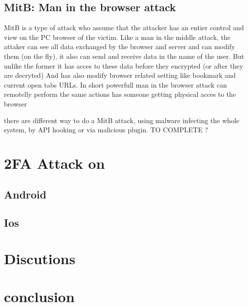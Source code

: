 \documentclass[11pt]{article}
\begin{document}
\subsection{MitB: Man in the browser attack}
MitB is a type of attack who assume that the attacker has an entier control and 
view on the PC browser of the victim. Like a man in the middle attack, the attaker can see all data 
exchanged by the browser and server and can modify them (on the fly). it also can send and receive 
data in the name of the user. 
But unlike the former it has acces to these data before they encrypted (or after they are decryted) 
And has also modify browser related setting like bookmark and current open tabs 
URLs. In short powerfull man in the browser attack can remotelly perform the same actions 
has someone getting physical acces to the browser

there are different way to do a MitB attack, using malware infecting the whole 
system, by API hooking or via malicious plugin. TO COMPLETE ?
\section{2FA Attack on }
\subsection{Android}
\subsection{Ios}
\section{Discutions} 
\section{conclusion}

 

\end{document}
